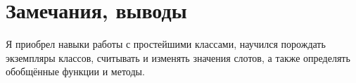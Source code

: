 \documentclass[12pt]{article}
\begin{document}

\section{Замечания, выводы}
Я приобрел навыки работы с простейшими классами, научился порождать экземпляры классов, считывать и изменять значения слотов, а также определять обобщённые функции и методы.
\end{document}
